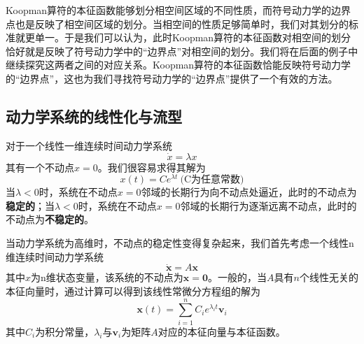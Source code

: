Koopman算符的本征函数能够划分相空间区域的不同性质\cite{JJY2015Koopman}，而符号动力学的边界点也是反映了相空间区域的划分。当相空间的性质足够简单时，我们对其划分的标准就更单一。于是我们可以认为，此时Koopman算符的本征函数对相空间的划分恰好就是反映了符号动力学中的“边界点”对相空间的划分。我们将在后面的例子中继续探究这两者之间的对应关系。Koopman算符的本征函数恰能反映符号动力学的“边界点”，这也为我们寻找符号动力学的“边界点”提供了一个有效的方法。

\subsection{动力学系统的线性化与流型}

对于一个线性一维连续时间动力学系统
\begin{equation}
    \dot{x}=\lambda x
\end{equation}
其有一个不动点$x=0$。我们很容易求得其解为
\begin{equation}
    x(t)=Ce^{\lambda t}\   \text{(C为任意常数)}
\end{equation}
当$\lambda<0$时，系统在不动点$x=0$邻域的长期行为向不动点处逼近，此时的不动点为\textbf{稳定的}；当$\lambda<0$时，系统在不动点$x=0$邻域的长期行为逐渐远离不动点，此时的不动点为\textbf{不稳定的}。

当动力学系统为高维时，不动点的稳定性变得复杂起来，我们首先考虑一个线性n维连续时间动力学系统
\begin{equation}
    \dot{\mathbf{x}}=A\mathbf{x}
\end{equation}
其中$x$为n维状态变量，该系统的不动点为$\mathbf{x}=\mathbf{0}$。一般的，当$A$具有$n$个线性无关的本征向量时，通过计算\cite{strogatz2001nonlinear}可以得到该线性常微分方程组的解为
\begin{equation}
    \mathbf{x}(t)=\sum_{i=1}^n C_ie^{\lambda_it}\mathbf{v}_i
\end{equation}
其中$C_i$为积分常量，$\lambda_i$与$\mathbf{v}_i$为矩阵$A$对应的本征向量与本征函数。

